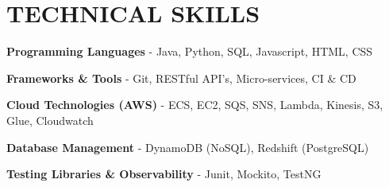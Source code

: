     \section{TECHNICAL SKILLS}

        \begin{onecolentry}
            \textbf{Programming Languages} - Java, Python, SQL, Javascript, HTML, CSS
        \end{onecolentry}

        \vspace{0.1 cm}

        \begin{onecolentry}
            \textbf{Frameworks \& Tools} - Git, RESTful API's, Micro-services, CI \& CD 
        \end{onecolentry}

        \vspace{0.1 cm}

        \begin{onecolentry}
            \textbf{Cloud Technologies (AWS)} - ECS, EC2, SQS, SNS, Lambda, Kinesis, S3, Glue, Cloudwatch
        \end{onecolentry}

        \vspace{0.1 cm}

        \begin{onecolentry}
            \textbf{Database Management}  - DynamoDB \small{(NoSQL)}, Redshift \small{(PostgreSQL)}
        \end{onecolentry}

        \vspace{0.1 cm}
        
        \begin{onecolentry}
            \textbf{Testing Libraries \& Observability}  - Junit, Mockito, TestNG
        \end{onecolentry}